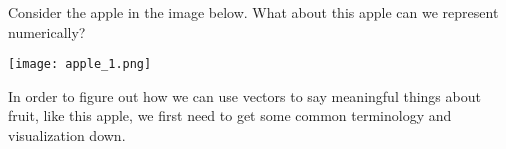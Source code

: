 \documentclass{ximera}
\begin{document}
\begin{exploration}

Consider the apple in the image below. What about this apple can we represent numerically?

\begin{center}
  \texttt{[image: apple\_1.png]}
\end{center}

\begin{selectAll}
\end{selectAll}
\end{exploration}

In order to figure out how we can use vectors to say meaningful things about fruit, like this apple, we first need to get some common terminology and visualization down.
\end{document}
